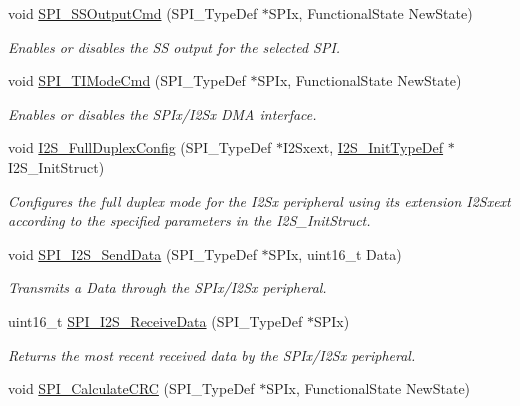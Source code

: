 \begin{DoxyCompactItemize}
void \mbox{\hyperlink{group___s_p_i_ga4ec54abdedf6cd17403d853a926d91c1}{S\+P\+I\+\_\+\+S\+S\+Output\+Cmd}} (S\+P\+I\+\_\+\+Type\+Def $\ast$S\+P\+Ix, Functional\+State New\+State)
\begin{DoxyCompactList}\small\item\em Enables or disables the SS output for the selected S\+PI. \end{DoxyCompactList}\item 
void \mbox{\hyperlink{group___s_p_i_ga74594bf32e3bf4905ac7a2deef8eb475}{S\+P\+I\+\_\+\+T\+I\+Mode\+Cmd}} (S\+P\+I\+\_\+\+Type\+Def $\ast$S\+P\+Ix, Functional\+State New\+State)
\begin{DoxyCompactList}\small\item\em Enables or disables the S\+P\+Ix/\+I2\+Sx D\+MA interface. \end{DoxyCompactList}\item 
void \mbox{\hyperlink{group___s_p_i_ga60082947bedfe9efc233405be2a7bec2}{I2\+S\+\_\+\+Full\+Duplex\+Config}} (S\+P\+I\+\_\+\+Type\+Def $\ast$I2\+Sxext, \mbox{\hyperlink{struct_i2_s___init_type_def}{I2\+S\+\_\+\+Init\+Type\+Def}} $\ast$I2\+S\+\_\+\+Init\+Struct)
\begin{DoxyCompactList}\small\item\em Configures the full duplex mode for the I2\+Sx peripheral using its extension I2\+Sxext according to the specified parameters in the I2\+S\+\_\+\+Init\+Struct. \end{DoxyCompactList}\item 
void \mbox{\hyperlink{group___s_p_i_gad5af40bebe8dbe3fa8bd476489d7e3da}{S\+P\+I\+\_\+\+I2\+S\+\_\+\+Send\+Data}} (S\+P\+I\+\_\+\+Type\+Def $\ast$S\+P\+Ix, uint16\+\_\+t Data)
\begin{DoxyCompactList}\small\item\em Transmits a Data through the S\+P\+Ix/\+I2\+Sx peripheral. \end{DoxyCompactList}\item 
uint16\+\_\+t \mbox{\hyperlink{group___s_p_i_gab77de76547f3bff403236b263b070a30}{S\+P\+I\+\_\+\+I2\+S\+\_\+\+Receive\+Data}} (S\+P\+I\+\_\+\+Type\+Def $\ast$S\+P\+Ix)
\begin{DoxyCompactList}\small\item\em Returns the most recent received data by the S\+P\+Ix/\+I2\+Sx peripheral. \end{DoxyCompactList}\item 
void \mbox{\hyperlink{group___s_p_i_ga64f7276d119e6cb58afc100f8832adb0}{S\+P\+I\+\_\+\+Calculate\+C\+RC}} (S\+P\+I\+\_\+\+Type\+Def $\ast$S\+P\+Ix, Functional\+State New\+State)

\end{DoxyCompactItemize}
